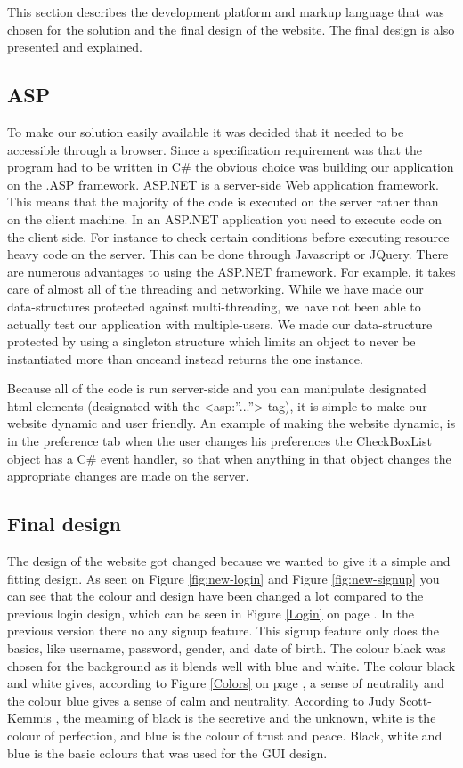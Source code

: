 This section describes the development platform and markup language that was chosen for the solution and the final design of the website. The final design is also presented and explained.

\subsection{ASP}
To make our solution easily available it was decided that it needed to be accessible through a browser. Since a specification requirement was that the program had to be written in C\# the obvious choice was building our application on the .ASP framework. ASP.NET is a server-side Web application framework. This means that the majority of the code is executed on the server rather than on the client machine. In an ASP.NET application you need to execute code on the client side. For instance to check certain conditions before executing resource heavy code on the server. This can be done through Javascript or JQuery. There are numerous advantages to using the ASP.NET framework. For example, it takes care of almost all of the threading and networking. While we have made our data-structures protected against multi-threading, we have not been able to actually test our application with multiple-users. We made our data-structure protected by using a singleton structure which limits an object to never be instantiated more than onceand instead returns the one instance.

Because all of the code is run server-side and you can manipulate designated html-elements  (designated with the <asp:”...”> tag), it is simple to make our website dynamic and user friendly. An example of making the website dynamic, is in the preference tab when the user changes his preferences the CheckBoxList object has a C\# event handler, so that when anything in that object changes the appropriate changes are made on the server.

\subsection{Final design}
The design of the website got changed because we wanted to give it a simple and fitting design. As seen on Figure \ref{fig:new-login} and Figure \ref{fig:new-signup} you can see that the colour and design have been changed a lot compared to the previous login design, which can be seen in Figure \ref{Login} on page \pageref{Login}. In the previous version there no any signup feature. This signup feature only does the basics, like username, password, gender, and date of birth. The colour black was chosen for the background as it blends well with blue and white. The colour black and white gives, according to Figure \ref{Colors} on page \pageref{Colors}, a sense of neutrality and the colour blue gives a sense of calm and neutrality. According to Judy Scott-Kemmis \cite{EmpowerColor}, the meaming of black is the secretive and the unknown, white is the colour of perfection, and blue is the colour of trust and peace. Black, white and blue is the basic colours that was used for the GUI design.


